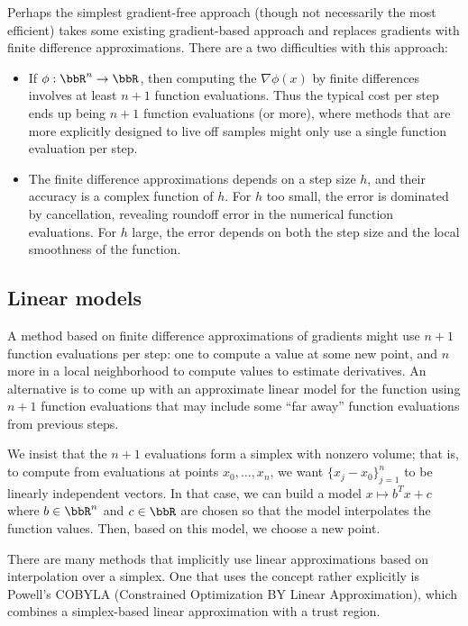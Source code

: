 \documentclass[12pt, leqno]{article} %
\begin{document}
Perhaps the simplest gradient-free approach (though not necessarily
the most efficient) takes some existing gradient-based approach
and replaces gradients with finite difference approximations.
There are a two difficulties with this approach:
\begin{itemize}
  \item If $\phi : \bbR^n \rightarrow \bbR$, then computing the
    $\nabla \phi(x)$ by finite differences involves at least $n+1$
    function evaluations.  Thus the typical cost per step ends up
    being $n+1$ function evaluations (or more), where methods that are
    more explicitly designed to live off samples might only use a
    single function evaluation per step.
  \item The finite difference approximations depends on a
    step size $h$, and their accuracy is a complex function of $h$.
    For $h$ too small, the error is dominated by cancellation,
    revealing roundoff error in the numerical function evaluations.
    For $h$ large, the error depends on both the step size and the
    local smoothness of the function.
\end{itemize}

\subsection{Linear models}

A method based on finite difference approximations of gradients might
use $n+1$ function evaluations per step: one to compute a value at
some new point, and $n$ more in a local neighborhood to compute values
to estimate derivatives.  An alternative is to come up with an
approximate linear model for the function using $n+1$ function
evaluations that may include some ``far away'' function evaluations
from previous steps.

We insist that the $n+1$ evaluations form a simplex with nonzero
volume; that is, to compute from evaluations at points $x_0, \ldots,
x_n$, we want $\{ x_j-x_0 \}_{j=1}^n$ to be linearly independent
vectors.  In that case, we can build a model $x \mapsto b^T x + c$
where $b \in \bbR^n$ and $c \in \bbR$ are chosen so that the model
interpolates the function values.  Then, based on this model,
we choose a new point.

There are many methods that implicitly use linear approximations
based on interpolation over a simplex.  One that uses the concept
rather explicitly is Powell's COBYLA (Constrained Optimization BY
Linear Approximation), which combines a simplex-based linear
approximation with a trust region.
\end{document}
